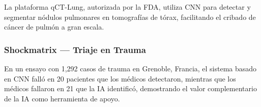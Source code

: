 La plataforma qCT-Lung, autorizada por la FDA, utiliza CNN para detectar y segmentar nódulos pulmonares en tomografías de tórax, facilitando el cribado de cáncer de pulmón a gran escala.

\subsubsection{Shockmatrix — Triaje en Trauma}

En un ensayo con 1,292 casos de trauma en Grenoble, Francia, el sistema basado en CNN falló en 20 pacientes que los médicos detectaron, mientras que los médicos fallaron en 21 que la IA identificó, demostrando el valor complementario de la IA como herramienta de apoyo.
